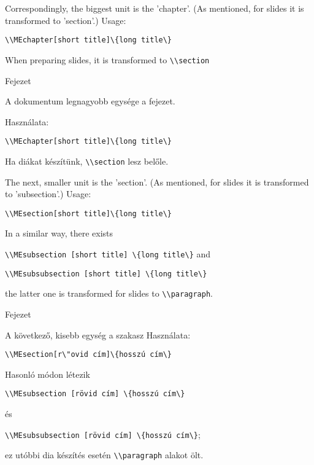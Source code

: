 {
Correspondingly, the biggest unit is the 'chapter'.
(As mentioned, for slides it is transformed to 'section'.)
Usage:\par
\noindent\lstinline|\\MEchapter[short title]\{long title\}|

When preparing slides, it is transformed to \lstinline|\\section|
}
{Fejezet}
{

A dokumentum legnagyobb egysége a fejezet.

Használata:\par
\noindent\lstinline|\\MEchapter[short title]\{long title\}|

Ha diákat készítünk,  \lstinline|\\section| lesz belőle.

}

{
The next, smaller unit is the 'section'.
(As mentioned, for slides it is transformed to 'subsection'.)
Usage:\par
\noindent\lstinline|\\MEsection[short title]\{long title\}|

In a similar way, there exists

\lstinline|\\MEsubsection [short title] \{long title\}|
and

\lstinline|\\MEsubsubsection [short title] \{long title\}|

 the latter one is
transformed for slides to \lstinline|\\paragraph|.
}
{Fejezet}
{
A következő, kisebb egység a szakasz
Használata:\par
\noindent\lstinline|\\MEsection[r\"ovid cím]\{hosszú cím\}|

Hasonló módon létezik

\lstinline|\\MEsubsection [rövid cím] \{hosszú cím\}|


és

\lstinline|\\MEsubsubsection [rövid cím] \{hosszú cím\}|; 

ez utóbbi dia készítés esetén \lstinline|\\paragraph| alakot ölt.

}

